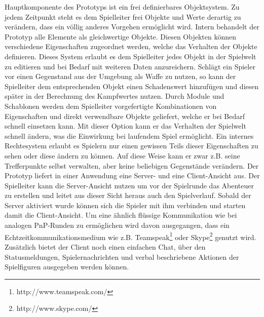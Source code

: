 Hauptkomponente des Prototyps ist ein frei definierbares Objektsystem. Zu jedem Zeitpunkt steht es dem Spielleiter frei Objekte und Werte derartig zu verändern, dass ein völlig anderes Vorgehen ermöglicht wird. Intern behandelt der Prototyp alle Elemente als gleichwertige Objekte. Diesen Objekten können verschiedene Eigenschaften zugeordnet werden, welche das Verhalten der Objekte definieren. Dieses System erlaubt es dem Spielleiter jedes Objekt in der Spielwelt zu editieren und bei Bedarf mit weiteren Daten anzureichern. Schlägt ein Spieler vor einen Gegenstand aus der Umgebung als Waffe zu nutzen, so kann der Spielleiter dem entsprechenden Objekt einen Schadenswert hinzufügen und diesen später in der Berechnung des Kampfwertes nutzen.\newline
Durch Module und Schablonen werden dem Spielleiter vorgefertigte Kombinationen von Eigenschaften und direkt verwendbare Objekte geliefert, welche er bei Bedarf schnell einsetzen kann. Mit dieser Option kann er das Verhalten der Spielwelt schnell ändern, was die Einwirkung bei laufendem Spiel ermöglicht.\newline
Ein internes Rechtesystem erlaubt es Spielern nur einen gewissen Teils dieser Eigenschaften zu sehen oder diese ändern zu können. Auf diese Weise kann er zwar z.B. seine Trefferpunkte selbst verwalten, aber keine beliebigen Gegenstände verändern.
Der Prototyp liefert in einer Anwendung eine Server- und eine Client-Ansicht aus. Der Spielleiter kann die Server-Ansicht nutzen um vor der Spielrunde das Abenteuer zu erstellen und leitet aus dieser Sicht heraus auch den Spielverlauf. Sobald der Server aktiviert wurde können sich die Spieler mit ihm verbinden und starten damit die Client-Ansicht. Um eine ähnlich flüssige Kommunikation wie bei analogen PnP-Runden zu ermöglichen wird davon ausgegangen, dass ein Echtzeitkommunikationsmedium wie z.B. Teamspeak\footnote{http://www.teamspeak.com/} oder Skype\footnote{http://www.skype.com/} genutzt wird. Zusätzlich bietet der Client noch einen einfachen Chat, über den Statusmeldungen, Spielernachrichten und verbal beschriebene Aktionen der Spielfiguren ausgegeben werden können.\newline
